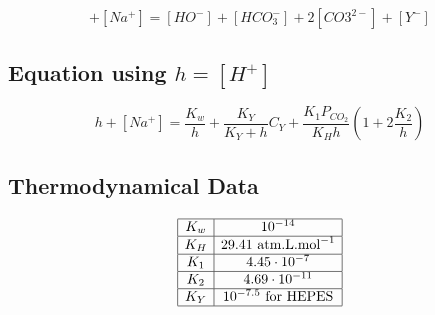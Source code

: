 \documentclass[aps,12pt]{revtex4}
\begin{document}
\begin{equation}
	[H^+] + [Na^+] = [HO^-] + [HCO_3^-] + 2[CO3^{2-}] + [Y^-]
\end{equation}

\subsection{Equation using $h=[H^+]$}

\begin{equation}
	h + [Na^+] = \dfrac{K_w}{h} + \dfrac{K_Y}{K_Y + h} C_Y + \dfrac{K_1 P_{CO_2}}{K_H h } \left( 1 + 2 \dfrac{K_2}{h} \right)
\end{equation}	

\subsection{Thermodynamical Data}

\begin{equation}
\begin{array}{|c|c|}
\hline
K_w & 10^{-14} \\
\hline
K_H & 29.41\text{ atm.L.mol}^{-1}\\
\hline
K_1 & 4.45 \cdot 10^{-7}\\
\hline
K_2 & 4.69 \cdot 10^{-11}\\
\hline
K_Y & 10^{-7.5} \text{ for HEPES}\\
\hline
\end{array}
\end{equation}
\end{document}
